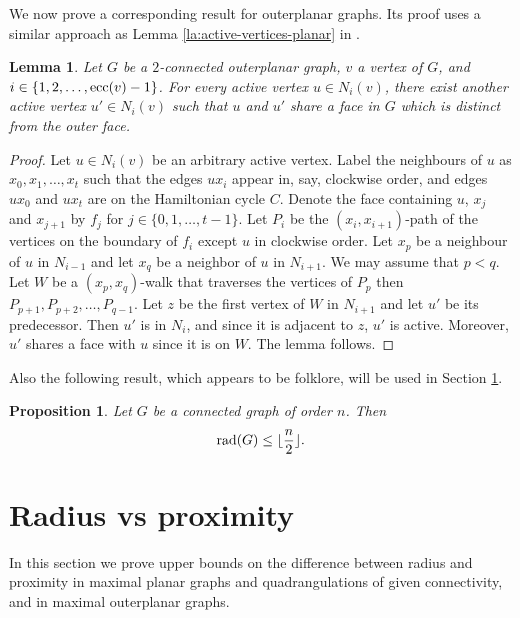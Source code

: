 \documentclass[a4paper,11pt]{article}
\newtheorem{proposition}[theorem]%
{Proposition}
\newtheorem{lemma}[theorem]%
{Lemma}
\begin{document}
We now prove a corresponding result for outerplanar graphs. Its proof uses a similar approach as Lemma \ref{la:active-vertices-planar} 
in \cite{AliDanMuk2012}. 

\begin{lemma}\label{lemm:2-connected outerplanar}
Let $G$ be a $2$-connected outerplanar graph, $v$ a vertex of $G$, and 
$i \in \{1,2,\ldots,{\rm ecc}(v)-1\}$. For every active vertex $u \in N_{i}(v)$, there exist another active vertex $u' \in N_{i}(v)$ such that $u$ and $u'$ share a face in $G$ which is distinct from 
the outer face.
 \end{lemma}
 
\begin{proof}
Let $u\in N_i(v)$ be an arbitrary active vertex. Label the neighbours of $u$ as $x_0,x_1,\ldots,x_t$ such that the edges $ux_i$ appear in, 
say, clockwise order, and edges $ux_0$ and $ux_t$ are on the Hamiltonian cycle $C$. Denote the face containing $u$, $x_j$ and $x_{j+1}$ by 
$f_j$ for $j \in \{0,1,\ldots,t-1\}$. Let $P_i$ be the $(x_i,x_{i+1})$-path of the vertices on the boundary of $f_i$ except $u$ in 
clockwise order. Let $x_p$ be a neighbour of $u$ in $N_{i-1}$ and let $x_q$ be a neighbor of $u$ in $N_{i+1}$. We may assume that $p < q$. 
Let $W$ be a $(x_p,x_q)$-walk that traverses the vertices of $P_{p}$ then $P_{p+1}, P_{p+2}, \ldots, P_{q-1}$. Let $z$ be the first vertex 
of $W$ in $N_{i+1}$ and let $u'$ be its predecessor. Then $u'$ is in $N_i$, and since it is adjacent to $z$, $u'$ is active. 
Moreover, $u'$ shares a face with $u$ since it is on $W$. The lemma follows.  
\end{proof}


Also the following result, which appears to be folklore, will be used in Section \ref{section:radius-vs-proximity}. 



\begin{proposition}  \label{prop:radius}
Let $G$ be a connected graph of order $n$. Then 
\[{\rm rad}(G) \leq \lfloor \frac{n}{2} \rfloor.\] 
\end{proposition}




\section{Radius vs proximity}
\label{section:radius-vs-proximity}

In this section we prove upper bounds on the difference between radius and proximity in 
maximal planar graphs and quadrangulations of given connectivity, and in maximal outerplanar graphs.
\end{document}
